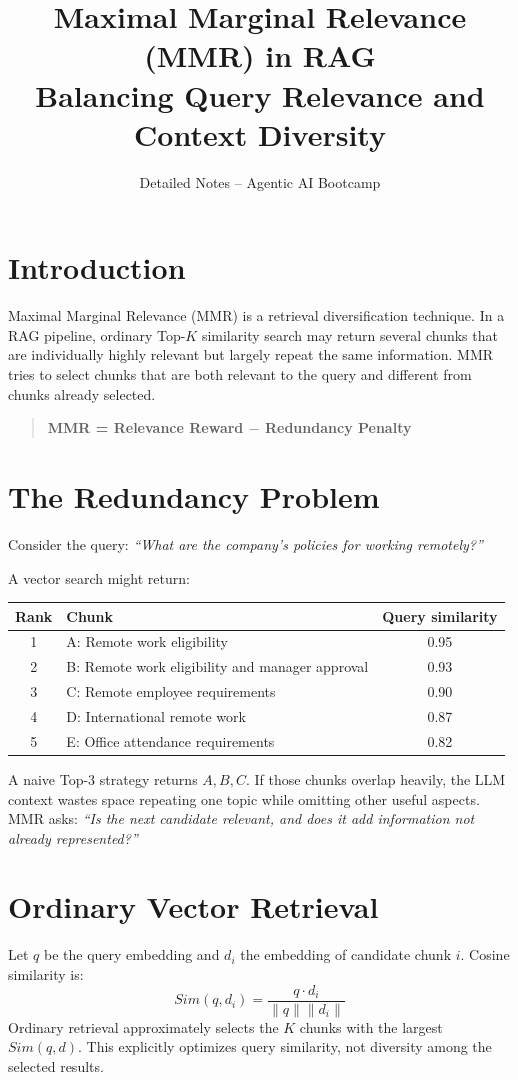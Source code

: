 \documentclass[12pt,a4paper]{article}
\title{\textbf{Maximal Marginal Relevance (MMR) in RAG}\\\large Balancing Query Relevance and Context Diversity}
\author{Detailed Notes -- Agentic AI Bootcamp}\date{}
\begin{document}
\maketitle\tableofcontents\newpage

\section{Introduction}
Maximal Marginal Relevance (MMR) is a retrieval diversification technique. In a RAG pipeline, ordinary Top-$K$ similarity search may return several chunks that are individually highly relevant but largely repeat the same information. MMR tries to select chunks that are both relevant to the query and different from chunks already selected.

\begin{quote}\textbf{MMR = Relevance Reward $-$ Redundancy Penalty}\end{quote}

\section{The Redundancy Problem}
Consider the query: \textit{``What are the company's policies for working remotely?''}

A vector search might return:
\begin{center}
\begin{tabular}{clc}\toprule
Rank&Chunk&Query similarity\\\midrule
1&A: Remote work eligibility&0.95\\
2&B: Remote work eligibility and manager approval&0.93\\
3&C: Remote employee requirements&0.90\\
4&D: International remote work&0.87\\
5&E: Office attendance requirements&0.82\\\bottomrule
\end{tabular}
\end{center}

A naive Top-3 strategy returns $A,B,C$. If those chunks overlap heavily, the LLM context wastes space repeating one topic while omitting other useful aspects. MMR asks: \textit{``Is the next candidate relevant, and does it add information not already represented?''}

\section{Ordinary Vector Retrieval}
Let $q$ be the query embedding and $d_i$ the embedding of candidate chunk $i$. Cosine similarity is:
\[
Sim(q,d_i)=\frac{q\cdot d_i}{\|q\|\|d_i\|}
\]
Ordinary retrieval approximately selects the $K$ chunks with the largest $Sim(q,d)$. This explicitly optimizes query similarity, not diversity among the selected results.
\end{document}
